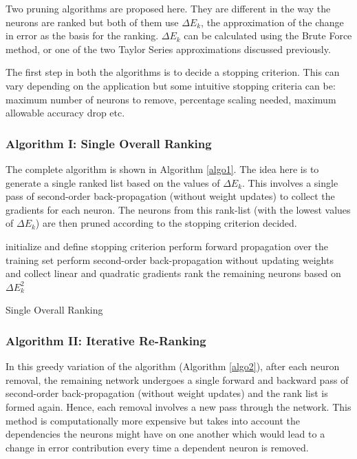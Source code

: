 Two pruning algorithms are proposed here. They are different in the way the neurons are ranked but both of them use $\Delta E_{k}$, the approximation of the change in error as the basis for the ranking. $\Delta E_{k}$ can be calculated using the Brute Force method, or one of the two Taylor Series approximations discussed previously.

The first step in both the algorithms is to  decide a stopping criterion. This can vary depending on the application but some intuitive stopping criteria can be: maximum number of neurons to remove, percentage scaling needed, maximum allowable accuracy drop etc. 

\subsubsection{Algorithm I: Single Overall Ranking}
The complete algorithm is shown in Algorithm \ref{algo1}. The idea here is to generate a single ranked list based on the values of $\Delta E_{k}$. This involves a single pass of second-order back-propagation (without weight updates) to collect the gradients for each neuron. The neurons from this rank-list (with the lowest values of $\Delta E_{k}$) are then pruned according to the stopping criterion decided.

\begin{algorithm}
 initialize and define stopping criterion \;
 perform forward propagation over the training set \;
  perform second-order back-propagation without updating weights and collect linear and quadratic gradients \;
  rank the remaining neurons based on $\Delta E_{k}^2$\;
 \caption{Single Overall Ranking}
 \label{algo1}
\end{algorithm}
 
\subsubsection{Algorithm II: Iterative Re-Ranking}

In this greedy variation of the algorithm (Algorithm \ref{algo2}), after each neuron removal, the remaining network undergoes a single forward and backward pass of second-order back-propagation (without weight updates) and the rank list is formed again. Hence, each removal involves a new pass through the network. This method is computationally more expensive but takes into account the dependencies the neurons might have on one another which would lead to a change in error contribution every time a dependent neuron is removed. 

